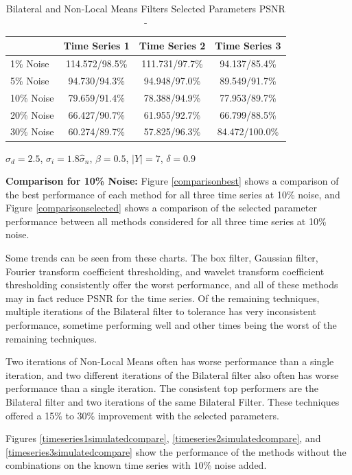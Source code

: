 \documentclass[11pt]{article}
\newcommand{\vs}{\vspace{0.1in}}
\theoremstyle{definition}
\begin{document}
\begin{table}[!h]
\small
\begin{center}
\begin{tabular}{l | c | c | c}
 & Time Series 1 & Time Series 2 & Time Series 3 \\ \hline
1\% Noise & 114.572/98.5\% & 111.731/97.7\% & 94.137/85.4\% \\ \hline
5\% Noise & 94.730/94.3\% & 94.948/97.0\% & 89.549/91.7\% \\ \hline
10\% Noise & 79.659/91.4\% & 78.388/94.9\% & 77.953/89.7\% \\ \hline
20\% Noise & 66.427/90.7\% & 61.955/92.7\% & 66.799/88.5\% \\ \hline
30\% Noise & 60.274/89.7\% & 57.825/96.3\% & 84.472/100.0\%
\end{tabular}
\caption{Bilateral and Non-Local Means Filters Selected Parameters PSNR -}
$\sigma_d = 2.5$, $\sigma_i = 1.8 \hat{\sigma}_n$, $\beta = 0.5$, $\lvert Y \rvert = 7$, $\delta = 0.9$
\label{bilateralnlmeansselectpsnr}
\end{center}
\end{table}

\vs
\noindent
\textbf{Comparison for 10\% Noise:} Figure \ref{comparisonbest} shows a comparison of the best performance of each method for all three time series at 10\% noise, and Figure \ref{comparisonselected} shows a comparison of the selected parameter performance between all methods considered for all three time series at 10\% noise.

Some trends can be seen from these charts. The box filter, Gaussian filter, Fourier transform coefficient thresholding, and wavelet transform coefficient thresholding consistently offer the worst performance, and all of these methods may in fact reduce PSNR for the time series. Of the remaining techniques, multiple iterations of the Bilateral filter to tolerance has very inconsistent performance, sometime performing well and other times being the worst of the remaining techniques.

Two iterations of Non-Local Means often has worse performance than a single iteration, and two different iterations of the Bilateral filter also often has worse performance than a single iteration. The consistent top performers are the Bilateral filter and two iterations of the same Bilateral Filter. These techniques offered a 15\% to 30\% improvement with the selected parameters.

Figures \ref{timeseries1simulatedcompare}, \ref{timeseries2simulatedcompare}, and \ref{timeseries3simulatedcompare} show the performance of the methods without the combinations on the known time series with $10$\% noise added.
\end{document}
